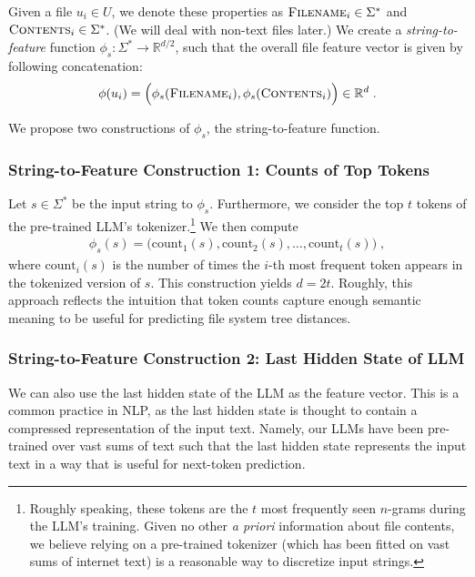 \documentclass{article}
\begin{document}
Given a file $u_i \in U$, we denote these properties as $\textsc{Filename}_i \in \Sigma^*$ and $\textsc{Contents}_i \in \Sigma^*$. (We will deal with non-text files later.) We create a \emph{string-to-feature} function $\phi_s: \Sigma^* \to \mathbb R^{d/2}$, such that the overall file feature vector is given by following concatenation:
\begin{align}
  \phi(u_i) =
  \Big(\phi_s(\textsc{Filename}_i), \phi_s(\textsc{Contents}_i) \Big) \in \mathbb R^d \; .
\end{align}

We propose two constructions of $\phi_s$, the string-to-feature function.

\subsubsection{String-to-Feature Construction 1: Counts of Top Tokens}

Let $s \in \Sigma^*$ be the input string to $\phi_s$. Furthermore, we consider the top $t$ tokens of the pre-trained LLM's tokenizer.\footnote{Roughly speaking, these tokens are the $t$ most frequently seen $n$-grams during the LLM's training. Given no other \emph{a priori} information about file contents, we believe relying on a pre-trained tokenizer (which has been fitted on vast sums of internet text) is a reasonable way to discretize input strings.} We then compute
\begin{align}
  \phi_s(s) = \Big( \text{count}_1(s), \text{count}_2(s), \dots, \text{count}_t(s) \Big) \; ,
\end{align}
where $\text{count}_i(s)$ is the number of times the $i$-th most frequent token appears in the tokenized version of $s$. This construction yields $d = 2t$. Roughly, this approach reflects the intuition that token counts capture enough semantic meaning to be useful for predicting file system tree distances.

\subsubsection{String-to-Feature Construction 2: Last Hidden State of LLM}

We can also use the last hidden state of the LLM as the feature vector. This is a common practice in NLP, as the last hidden state is thought to contain a compressed representation of the input text. Namely, our LLMs have been pre-trained over vast sums of text such that the last hidden state represents the input text in a way that is useful for next-token prediction.
\end{document}
